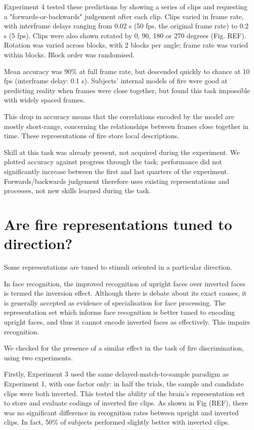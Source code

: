 \documentclass{jov}
\begin{document}
Experiment 4 tested these predictions by showing a series of clips and requesting a "forwards-or-backwards" judgement after each clip. Clips varied in frame rate, with interframe delays ranging from 0.02 s (50 fps, the original frame rate) to 0.2 s (5 fps). Clips were also shown rotated by 0, 90, 180 or 270 degrees (Fig. REF). Rotation was varied across blocks, with 2 blocks per angle; frame rate was varied within blocks. Block order was randomised.

Mean accuracy was 90\% at full frame rate, but descended quickly to chance at 10 fps (interframe delay: 0.1 s). Subjects' internal models of fire were good at predicting reality when frames were close together, but found this task impossible with widely spaced frames.

This drop in accuracy means that the correlations encoded by the model are mostly short-range, concerning the relationships between frames close together in time. These representations of fire store local descriptions.

Skill at this task was already present, not acquired during the experiment. We plotted accuracy against progress through the task; performance did not significantly increase between the first and last quarters of the experiment. Forwards/backwards judgement therefore uses existing representations and processes, not new skills learned during the task.




\section{Are fire representations tuned to direction?}

Some representations are tuned to stimuli oriented in a particular direction.

In face recognition, the improved recognition of upright faces over inverted faces is termed the inversion effect. Although there is debate about its exact causes\cite{farah1995causes}, it is generally accepted as evidence of specialisation for face processing. The representation set which informs face recognition is better tuned to encoding upright faces, and thus it cannot encode inverted faces as effectively. This impairs recognition.

We checked for the presence of a similar effect in the task of fire discrimination, using two experiments. 

Firstly, Experiment 3 used the same delayed-match-to-sample paradigm as Experiment 1, with one factor only: in half the trials, the sample and candidate clips were both inverted. This tested the ability of the brain's representation set to store and evaluate codings of inverted fire clips. As shown in Fig (REF), there was no significant difference in recognition rates between upright and inverted clips. In fact, 50\% of subjects performed slightly better with inverted clips.
\end{document}
